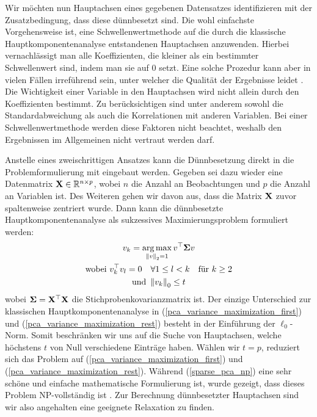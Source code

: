 Wir möchten nun Hauptachsen eines gegebenen Datensatzes identifizieren mit der Zusatzbedingung, dass diese dünnbesetzt sind. Die wohl einfachste Vorgehensweise ist, eine Schwellenwertmethode auf die durch die klassische Hauptkomponentenanalyse entstandenen Hauptachsen anzuwenden. Hierbei vernachlässigt man alle Koeffizienten, die kleiner als ein bestimmter Schwellenwert sind, indem man sie auf 0 setzt. Eine solche Prozedur kann aber in vielen Fällen irreführend sein, unter welcher die Qualität der Ergebnisse leidet \cite{cadima}. Die Wichtigkeit einer Variable in den Hauptachsen wird nicht allein durch den Koeffizienten bestimmt. Zu berücksichtigen sind unter anderem sowohl die Standardabweichung als auch die Korrelationen mit anderen Variablen. Bei einer Schwellenwertmethode werden diese Faktoren nicht beachtet, weshalb den Ergebnissen im Allgemeinen nicht vertraut werden darf.

Anstelle eines zweischrittigen Ansatzes kann die Dünnbesetzung direkt in die Problemformulierung mit eingebaut werden. Gegeben sei dazu wieder eine Datenmatrix $\mathbf{X} \in \mathbb{R}^{n \times p}$, wobei $n$ die Anzahl an Beobachtungen und $p$ die Anzahl an Variablen ist. Des Weiteren gehen wir davon aus, dass die Matrix $\mathbf{X}$ zuvor spaltenweise zentriert wurde. Dann kann die dünnbesetzte Hauptkomponentenanalyse als sukzessives Maximierungsproblem formuliert werden:
\begin{gather}
\label{sparse_pca_np}
\begin{gathered}
v_{k} = \operatorname*{arg\,max}_{\left\lVert v \right\rVert_2 = 1} v^{\top}\mathbf{\Sigma} v\\
\text{wobei } v_{k}^{\top}v_{l} = 0 \quad \forall 1 \leq l < k \quad \text{für } k\geq 2\\
\text{und } \left\lVert v_{k} \right\rVert_0 \leq t 
\end{gathered}
\end{gather}
wobei $\mathbf{\Sigma} = \mathbf{X}^{\top} \mathbf{X}$ die Stichprobenkovarianzmatrix ist. Der einzige Unterschied zur klassischen Hauptkomponentenanalyse in (\ref{pca_variance_maximization_first}) und (\ref{pca_variance_maximization_rest}) besteht in der Einführung der $\ell_0$-Norm. Somit beschränken wir uns auf die Suche von Hauptachsen, welche höchstens $t$ von Null verschiedene Einträge haben. Wählen wir $t = p$, reduziert sich das Problem auf (\ref{pca_variance_maximization_first}) und (\ref{pca_variance_maximization_rest}). Während (\ref{sparse_pca_np}) eine sehr schöne und einfache mathematische Formulierung ist, wurde gezeigt, dass dieses Problem NP-vollständig ist \cite{foucart}. Zur Berechnung dünnbesetzter Hauptachsen sind wir also angehalten eine geeignete Relaxation zu finden.


